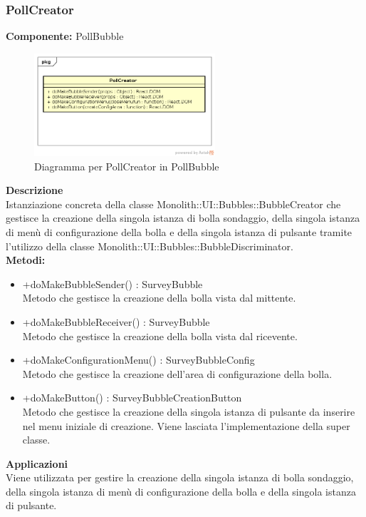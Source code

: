 \clearpage

\subsubsection{PollCreator}
\textbf{Componente:}  PollBubble\\
   \FloatBarrier
   \begin{figure}[ht]
   \centering
   \includegraphics[width=0.6\textwidth]{img/single-PollCreator}
   \caption{{Diagramma per PollCreator in PollBubble}}
\end{figure}
\FloatBarrier
\textbf{Descrizione}\\
Istanziazione concreta della classe Monolith::UI::Bubbles::BubbleCreator che gestisce la creazione della singola istanza di bolla sondaggio, della singola istanza di menù di configurazione della bolla e della singola istanza di pulsante tramite l'utilizzo della classe Monolith::UI::Bubbles::BubbleDiscriminator.
\\
\textbf{Metodi:} 
\begin{itemize}
\item +doMakeBubbleSender() : SurveyBubble 
\\
Metodo che gestisce la creazione della bolla vista dal mittente.
\item +doMakeBubbleReceiver() : SurveyBubble 
\\
Metodo che gestisce la creazione della bolla vista dal ricevente.
\item +doMakeConfigurationMenu() : SurveyBubbleConfig 
\\
Metodo che gestisce la creazione dell'area di configurazione della bolla.
\item +doMakeButton() : SurveyBubbleCreationButton 
\\
Metodo che gestisce la creazione della singola istanza di pulsante da inserire nel menu iniziale di creazione. Viene lasciata l'implementazione della super classe.
\end{itemize} 


\textbf{Applicazioni}\\
Viene utilizzata per gestire la creazione della singola istanza di bolla sondaggio, della singola istanza di menù di configurazione della bolla e della singola istanza di pulsante. 


